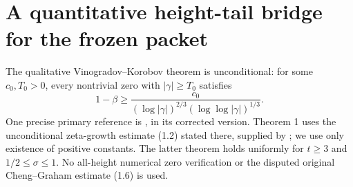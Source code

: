 \documentclass[11pt]{article}
\theoremstyle{remark}\newtheorem{remark}[theorem]{Remark}
\begin{document}
\section{A quantitative height-tail bridge for the frozen packet}
The qualitative Vinogradov--Korobov theorem is unconditional:
for some $c_0,T_0>0$, every nontrivial zero with $|\gamma|\ge T_0$
satisfies
\[
 1-\beta\ge
 \frac{c_0}{(\log|\gamma|)^{2/3}
                     (\log\log|\gamma|)^{1/3}}.
\]
One precise primary reference is \cite[p.~1, (1.1) and Theorem 1]{FordZF},
in its corrected version. Theorem 1 uses the unconditional
zeta-growth estimate (1.2) stated there, supplied by
\cite[Theorem 1]{FordGrowth}; we use only existence of
positive constants. The latter theorem holds uniformly for
$t\ge3$ and $1/2\le\sigma\le1$. No all-height numerical zero verification or
the disputed original Cheng--Graham estimate (1.6) is used.
\end{document}
